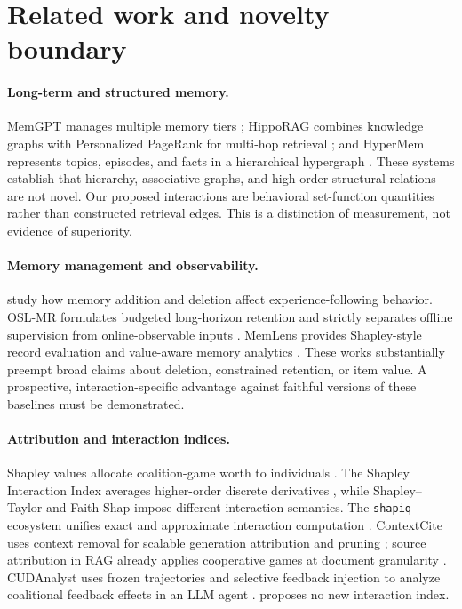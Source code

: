 \section{Related work and novelty boundary}
\label{sec:related}

\paragraph{Long-term and structured memory.}
MemGPT manages multiple memory tiers \citep{packer2023memgpt}; HippoRAG combines
knowledge graphs with Personalized PageRank for multi-hop retrieval
\citep{gutierrez2024hipporag}; and HyperMem represents topics, episodes, and facts in
a hierarchical hypergraph \citep{yue2026hypermem}. These systems establish that
hierarchy, associative graphs, and high-order structural relations are not novel.
Our proposed interactions are behavioral set-function quantities rather than
constructed retrieval edges. This is a distinction of measurement, not evidence of
superiority.

\paragraph{Memory management and observability.}
\citet{xiong2026memory} study how memory addition and deletion affect
experience-following behavior. OSL-MR formulates budgeted long-horizon retention and
strictly separates offline supervision from online-observable inputs
\citep{kang2026oslmr}. MemLens provides Shapley-style record evaluation and
value-aware memory analytics \citep{wei2026memlens}. These works substantially
preempt broad claims about deletion, constrained retention, or item value. A
prospective, interaction-specific advantage against faithful versions of these
baselines must be demonstrated.

\paragraph{Attribution and interaction indices.}
Shapley values allocate coalition-game worth to individuals \citep{shapley1953}.
The Shapley Interaction Index averages higher-order discrete derivatives
\citep{grabisch1999}, while Shapley--Taylor \citep{sundararajan2020} and Faith-Shap
\citep{tsai2023} impose different interaction semantics. The \texttt{shapiq}
ecosystem unifies exact and approximate interaction computation
\citep{muschalik2024shapiq}. ContextCite uses context removal for scalable generation
attribution and pruning \citep{cohenwang2024contextcite}; source attribution in RAG
already applies cooperative games at document granularity
\citep{nematov2025source}. CUDAnalyst uses frozen trajectories and selective feedback
injection to analyze coalitional feedback effects in an LLM agent
\citep{chong2026cudanalyst}. \systemname{} proposes no new interaction index.

